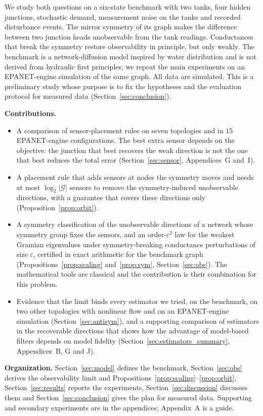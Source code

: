 \documentclass[conference]{IEEEtran}
\begin{document}
We study both questions on a six-state benchmark with two tanks, four hidden junctions, stochastic demand, measurement noise on the tanks and recorded disturbance events. The mirror symmetry of its graph makes the difference between two junction heads unobservable from the tank readings. Conductances that break the symmetry restore observability in principle, but only weakly. The benchmark is a network-diffusion model inspired by water distribution and is not derived from hydraulic first principles; we repeat the main experiments on an EPANET-engine simulation of the same graph. All data are simulated. This is a preliminary study whose purpose is to fix the hypotheses and the evaluation protocol for measured data (Section~\ref{sec:conclusion}).

\textbf{Contributions.}
\begin{itemize}
  \item A comparison of sensor-placement rules on seven topologies and in $15$ EPANET-engine configurations. The best extra sensor depends on the objective: the junction that best recovers the weak direction is not the one that best reduces the total error (Section~\ref{sec:sensor}, Appendices~G and~I).
  \item A placement rule that adds sensors at nodes the symmetry moves and needs at most $\log_2|\mathcal G|$ sensors to remove the symmetry-induced unobservable directions, with a guarantee that covers these directions only (Proposition~\ref{prop:orbit}).
  \item A symmetry classification of the unobservable directions of a network whose symmetry group fixes the sensors, and an order-$\varepsilon^2$ law for the weakest Gramian eigenvalues under symmetry-breaking conductance perturbations of size $\varepsilon$, certified in exact arithmetic for the benchmark graph (Propositions~\ref{prop:scaling} and~\ref{prop:sym}, Section~\ref{sec:obs}). The mathematical tools are classical and the contribution is their combination for this problem.
  \item Evidence that the limit binds every estimator we tried, on the benchmark, on two other topologies with nonlinear flow and on an EPANET-engine simulation (Section~\ref{sec:antisym}), and a supporting comparison of estimators in the recoverable directions that shows how the advantage of model-based filters depends on model fidelity (Section~\ref{sec:estimators_summary}, Appendices~B, G and J).
\end{itemize}

\textbf{Organization.} Section~\ref{sec:model} defines the benchmark, Section~\ref{sec:obs} derives the observability limit and Propositions~\ref{prop:scaling}--\ref{prop:orbit}, Section~\ref{sec:results} reports the experiments, Section~\ref{sec:discussion} discusses them and Section~\ref{sec:conclusion} gives the plan for measured data. Supporting and secondary experiments are in the appendices; Appendix~A is a guide.
\end{document}
